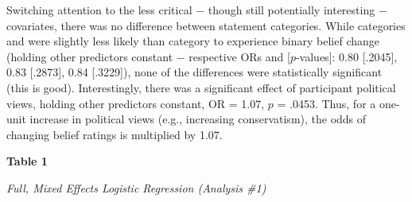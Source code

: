\documentclass[12pt]{article}  %
\begin{document}
Switching attention to the less critical $-$ though still potentially interesting $-$  covariates, there was no difference between statement categories. While categories   and  were slightly less likely than category  to experience binary belief change (holding other predictors constant $-$ respective ORs and [$p$-values]: 0.80 [.2045], 0.83 [.2873], 0.84 [.3229]), none of the differences were statistically significant (this is good). Interestingly, there was a significant effect of participant political views, holding other predictors constant, OR = 1.07, $p$ = .0453. Thus, for a one-unit increase in political views (e.g., increasing conservatism), the odds of changing belief ratings is multiplied by 1.07.


\newpage

\textbf{Table 1}

\textit{Full, Mixed Effects Logistic Regression (Analysis \#1)}

\vspace{0.5cm}
\end{document}
